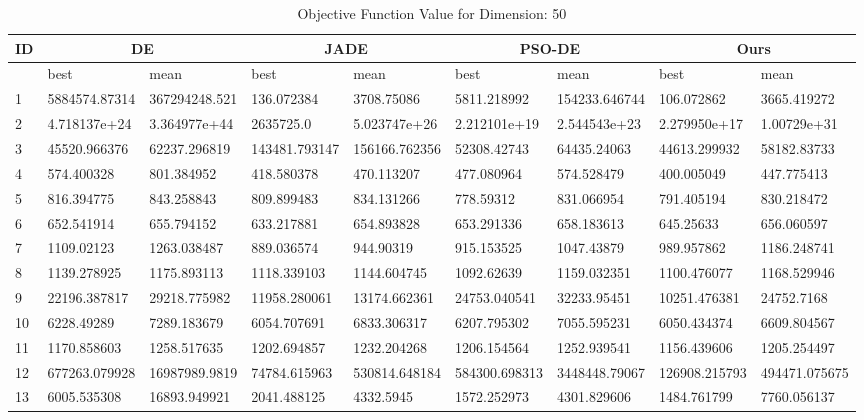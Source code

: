 \begin{table}
\centering
\caption{Objective Function Value for Dimension: 50}
 \begin{tabular}{|p{0.8cm}|p{1.6cm}|p{1.6cm}|p{1.6cm}|p{1.6cm}|p{1.6cm}|p{1.6cm}|p{1.6cm}|p{1.6cm}|} 
 \hline
 ID & \multicolumn{2}{c|}{DE} & \multicolumn{2}{c|}{JADE} & \multicolumn{2}{c|}{PSO-DE} & \multicolumn{2}{c|}{Ours} \\
 \hline
    & best & mean & best & mean & best & mean & best & mean \\ [0.5ex] 
 \hline
1  & 5884574.87314 & 367294248.521 & 136.072384 & 3708.75086 & 5811.218992 & 154233.646744 & 106.072862 & 3665.419272 \\ 
 \hline
2  & 4.718137e+24 & 3.364977e+44 & 2635725.0 & 5.023747e+26 & 2.212101e+19 & 2.544543e+23 & 2.279950e+17 & 1.00729e+31 \\ 
 \hline
3  & 45520.966376 & 62237.296819 & 143481.793147 & 156166.762356 & 52308.42743 & 64435.24063 & 44613.299932 & 58182.83733 \\ 
 \hline
4  & 574.400328 & 801.384952 & 418.580378 & 470.113207 & 477.080964 & 574.528479 & 400.005049 & 447.775413 \\ 
 \hline
5  & 816.394775 & 843.258843 & 809.899483 & 834.131266 & 778.59312 & 831.066954 & 791.405194 & 830.218472 \\ 
 \hline
6  & 652.541914 & 655.794152 & 633.217881 & 654.893828 & 653.291336 & 658.183613 & 645.25633 & 656.060597 \\ 
 \hline
7  & 1109.02123 & 1263.038487 & 889.036574 & 944.90319 & 915.153525 & 1047.43879 & 989.957862 & 1186.248741 \\ 
 \hline
8  & 1139.278925 & 1175.893113 & 1118.339103 & 1144.604745 & 1092.62639 & 1159.032351 & 1100.476077 & 1168.529946 \\ 
 \hline
9  & 22196.387817 & 29218.775982 & 11958.280061 & 13174.662361 & 24753.040541 & 32233.95451 & 10251.476381 & 24752.7168 \\ 
 \hline
10  & 6228.49289 & 7289.183679 & 6054.707691 & 6833.306317 & 6207.795302 & 7055.595231 & 6050.434374 & 6609.804567 \\ 
 \hline
11  & 1170.858603 & 1258.517635 & 1202.694857 & 1232.204268 & 1206.154564 & 1252.939541 & 1156.439606 & 1205.254497 \\ 
 \hline
12  & 677263.079928 & 16987989.9819 & 74784.615963 & 530814.648184 & 584300.698313 & 3448448.79067 & 126908.215793 & 494471.075675 \\ 
 \hline
13  & 6005.535308 & 16893.949921 & 2041.488125 & 4332.5945 & 1572.252973 & 4301.829606 & 1484.761799 & 7760.056137 \\ 

\end{tabular}
\end{table}
